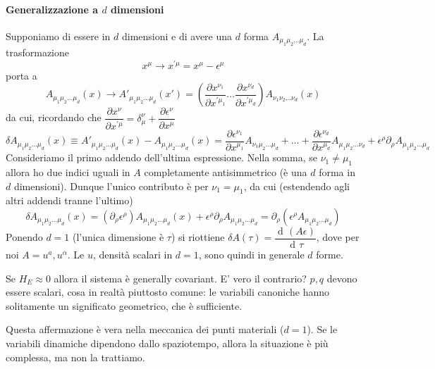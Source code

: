 \documentclass[a4paper, 11pt]{article}
\newcommand{\dd}{\mathop{\mathrm{d}\!}{}}
\newcommand{\deriv}[2]{\dfrac{\dd #1}{\dd #2}}
\newcommand{\pderiv}[2]{\dfrac{\partial #1}{\partial #2}}
\begin{document}
	\paragraph{Generalizzazione a $d$ dimensioni} Supponiamo di essere in $d$ dimensioni e di avere una $d$ forma $A_{\mu_1\mu_2\dots\mu_d}$. La trasformazione
	\begin{equation*}
	x^\mu\rightarrow x^{'\mu}=x^\mu-\epsilon^\mu
	\end{equation*}
	porta a
	\begin{equation*}
	A_{\mu_1\mu_2\dots\mu_d}(x) \rightarrow A'_{\mu_1\mu_2\dots\mu_d} (x') = \left( \pderiv{x^{\nu_1}}{x^{'\mu_1}} \dots \pderiv{x^{\nu_d}}{x^{'\mu_d}} \right) A_{\nu_1\nu_2\dots\nu_d}(x)
	\end{equation*}
	da cui, ricordando che $\pderiv{x^{\nu}}{x^{'\mu}} = \delta^\nu_\mu + \pderiv{\epsilon^\nu}{x^\mu}$
	\begin{equation*}
	\delta A_{\mu_1\mu_2\dots\mu_d}(x) \equiv A'_{\mu_1\mu_2\dots\mu_d}(x) - A_{\mu_1\mu_2\dots\mu_d}(x) = \pderiv{\epsilon^{\nu_1}}{x^{\mu_1}} A_{\nu_1\mu_2\dots\mu_d} + \dots + \pderiv{\epsilon^{\nu_d}}{x^{\mu_d}} A_{\mu_1\mu_2\dots\nu_d} + \epsilon^\rho \partial_\rho A_{\mu_1\mu_2\dots\mu_d}
	\end{equation*}
	Consideriamo il primo addendo dell'ultima espressione. Nella somma, se $\nu_1\neq \mu_1$ allora ho due indici uguali in $A$ completamente antisimmetrico (è una $d$ forma in $d$ dimensioni). Dunque l'unico contributo è per $\nu_1=\mu_1$, da cui (estendendo agli altri addendi tranne l'ultimo)
	\begin{equation*}
	\delta A_{\mu_1\mu_2\dots\mu_d}(x) = (\partial_\rho\epsilon^\rho) A_{\mu_1\mu_2\dots\mu_d}(x) + \epsilon^\rho \partial_\rho A_{\mu_1\mu_2\dots\mu_d} = \partial_\rho(\epsilon^\rho A_{\mu_1\mu_2\dots\mu_d})
	\end{equation*}
	Ponendo $d=1$ (l'unica dimensione è $\tau$) si riottiene $\delta A(\tau) = \deriv{(A\epsilon)}{\tau}$, dove per noi $A=u^a,u^\alpha$. Le $u$, densità scalari in $d=1$, sono quindi in generale $d$ forme.
	
	\vspace{4mm}
	Se $H_E\approx 0$ allora il sistema è generally covariant. E' vero il contrario? $p,q$ devono essere scalari, cosa in realtà piuttosto comune: le variabili canoniche hanno solitamente un significato geometrico, che è sufficiente.
	
	\noindent Questa affermazione è vera nella meccanica dei punti materiali ($d=1$). Se le variabili dinamiche dipendono dallo spaziotempo, allora la situazione è più complessa, ma non la trattiamo.
	
\end{document}
